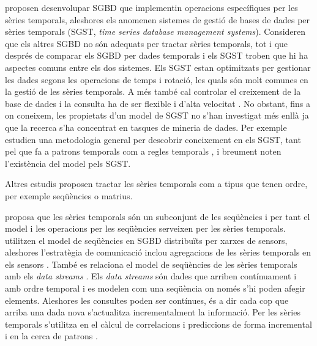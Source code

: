 \textcite{dreyer94} proposen desenvolupar SGBD que implementin operacions específiques per les sèries temporals, aleshores els anomenen sistemes de gestió de bases de dades per sèries temporals (SGST, \emph{time series database management systems}). Consideren que els altres SGBD no són adequats per tractar sèries temporals, tot i que després de comparar els SGBD per dades temporals i els SGST \parencite{schmidt95} troben que hi ha aspectes comuns entre els dos sistemes.
Els SGST estan optimitzats per gestionar les dades segons les operacions de temps i rotació, les quals són molt comunes en la gestió de les sèries temporals.  A més també cal controlar el creixement de la base de dades i la consulta ha de ser flexible i d'alta velocitat \parencite{keogh10:isax}. 
No obstant, fins a on coneixem, les propietats d'un model de SGST no s'han investigat més enllà  ja que la recerca s'ha concentrat en tasques de mineria de dades. Per exemple \textcite{last01} estudien una metodologia general per descobrir coneixement en els SGST, tant pel que fa a 
patrons temporals %
com a regles temporals%
, i breument noten l'existència del model \cite{dreyer94} pels SGST.


Altres estudis proposen tractar les sèries temporals com a tipus que tenen ordre, per exemple seqüències o matrius.

\textcite{seshadri96:thesis} proposa que les sèries temporals són un subconjunt de les seqüències i per tant el model i les operacions per les seqüències \parencite{seshadri95} serveixen per les sèries temporals. 
\textcite{bonnet01} utilitzen el model de seqüències en SGBD distribuïts per xarxes de sensors, aleshores l'estratègia de comunicació inclou agregacions de les sèries temporals en els sensors \parencite{demers03}.
També es relaciona el model de seqüències de les sèries temporals amb els \emph{data streams} \parencite{babcock02,jagadish95,ogras06}. Els \emph{data streams} són dades que arriben contínuament i amb ordre temporal i es modelen com una seqüència on només s'hi poden afegir elements. Aleshores les consultes poden ser contínues, és a dir cada cop que arriba una dada nova s'actualitza incrementalment la informació. Per les sèries temporals s'utilitza en el càlcul de correlacions i prediccions de forma incremental \parencite{yi00} i en la cerca de patrons \parencite{bai05}.

